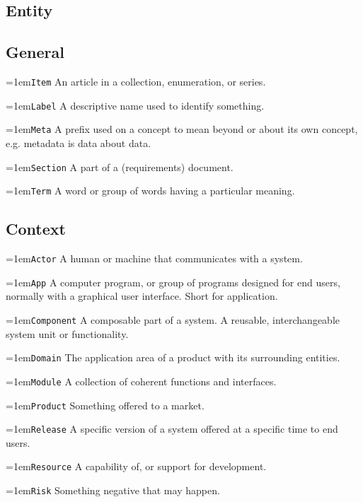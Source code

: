 \documentclass[9pt,a4paper,oneside]{report}
\begin{document}
\begin{multicols*}{4}
    \section*{Entity}

\subsection*{General}

\hangindent=1em\lstinline+Item+  An article in a collection, enumeration, or series.

\hangindent=1em\lstinline+Label+ A descriptive name used to identify something.

\hangindent=1em\lstinline+Meta+ A prefix used on a concept to mean beyond or about its own concept, e.g. metadata is data about data.

\hangindent=1em\lstinline+Section+ A part of a (requirements) document.

\hangindent=1em\lstinline+Term+ A word or group of words having a particular meaning.

\subsection*{Context}

\hangindent=1em\lstinline+Actor+ A human or machine that communicates with a system.

\hangindent=1em\lstinline+App+ A computer program, or group of programs designed for end users, normally with a graphical user interface. Short for application.

\hangindent=1em\lstinline+Component+ A composable part of a system. A reusable, interchangeable system unit or functionality.

\hangindent=1em\lstinline+Domain+ The application area of a product with its surrounding entities.

\hangindent=1em\lstinline+Module+ A collection of coherent functions and interfaces.

\hangindent=1em\lstinline+Product+ Something offered to a market.

\hangindent=1em\lstinline+Release+ A specific version of a system offered at a specific time to end users.

\hangindent=1em\lstinline+Resource+ A capability of, or support for development.

\hangindent=1em\lstinline+Risk+ Something negative that may happen.


\end{multicols*}
\end{document}
